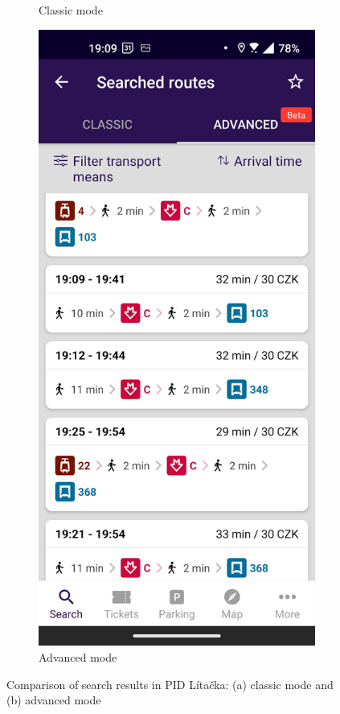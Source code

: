 \begin{figure}[h!]
\begin{subfigure}{.45\textwidth}
    \caption{Classic mode}
    \label{litacka_classic}
  \end{subfigure}%
  \hfill
  \begin{subfigure}{.45\textwidth}
  \centering
    \includegraphics[width=\linewidth]{img/screenshots/pid_litacka_result_extended.jpg}
    \caption{Advanced mode}
    \label{litacka_advanced}
  \end{subfigure}
  \caption{Comparison of search results in PID Lítačka: (a) classic mode and (b) advanced mode}
  \label{litacka}
\end{figure}

